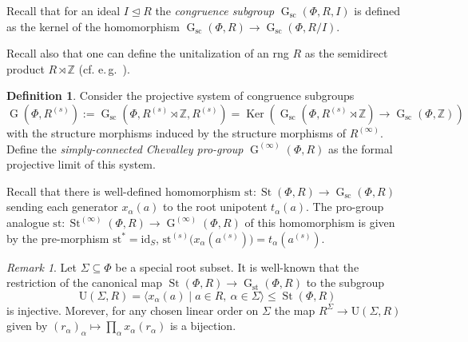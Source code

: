 \documentclass[oneside, 11pt]{amsart}
\numberwithin{equation}{section}
\theoremstyle{definition}
\newtheorem{df}[lemma]{Definition} \Crefname{df}{Definition}{Definitions}
\theoremstyle{remark}
\newtheorem{rem}[lemma]{Remark}
\DeclareMathOperator\St{St}
\DeclareMathOperator\Ker{Ker}
\DeclareMathOperator\GG{G}
\newcommand{\ZZ}{\mathbb{Z}}
\begin{document}
Recall that for an ideal $I \trianglelefteq R$ the {\it congruence subgroup} $\GG_\mathrm{sc}(\Phi, R, I)$ is defined as 
 the kernel of the homomorphism $\GG_\mathrm{sc}(\Phi, R) \to \GG_\mathrm{sc}(\Phi, R/I)$.

Recall also that one can define the unitalization of an rng $R$ as the semidirect product $R \rtimes \ZZ$ (cf. e.\,g.~\cite[Definition~3.2]{Sin}).
 \begin{df}
Consider the projective system of congruence subgroups
 \[\GG(\Phi, R^{(s)}) := \GG_{\mathrm{sc}}(\Phi, R^{(s)} \rtimes \ZZ, R^{(s)}) = \Ker\left(\GG_{\mathrm{sc}}(\Phi, R^{(s)} \rtimes \ZZ) \to \GG_{\mathrm{sc}}(\Phi, \ZZ)\right)\] with the structure morphisms induced by the structure morphisms of \(R^{(\infty)}\). Define the {\it simply-connected Chevalley pro-group} $\GG^{(\infty)}(\Phi, R)$ as the formal projective limit of this system.
\end{df}

Recall that there is well-defined homomorphism $\mathrm{st}\colon \St(\Phi, R) \to \GG_{\mathrm{sc}}(\Phi, R)$ sending each generator $x_\alpha(a)$ to the root unipotent $t_\alpha(a)$. The pro-group analogue \(\mathrm{st} \colon \St^{(\infty)}(\Phi, R) \to \GG^{(\infty)}(\Phi, R)\) of this homomorphism is given by the pre-morphism \(\mathrm{st}^* = \mathrm{id}_S\), \(\mathrm{st}^{(s)}\bigl(x_{\alpha}(a^{(s)})\bigr) = t_\alpha(a^{(s)})\). 

\begin{rem}\label{rem:uni-rad}
Let $\Sigma \subseteq \Phi$ be a special root subset. It is well-known that the restriction of the canonical map $\St(\Phi, R)\to\GG_{\mathrm{st}}(\Phi, R)$ to the subgroup \[\mathrm{U}(\Sigma, R) = \langle x_{\alpha}(a) \mid a\in R,\ \alpha\in \Sigma \rangle \leq \St(\Phi, R)\] is injective. Morever, for any chosen linear order on \(\Sigma\) the map $R^{\Sigma} \to \mathrm{U}(\Sigma, R)$ given by $(r_\alpha)_\alpha \mapsto \prod_\alpha x_\alpha(r_\alpha)$ is a bijection. \end{rem}
\end{document}
